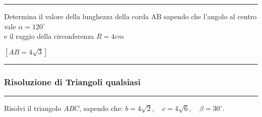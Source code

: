 \documentclass[12pt, a4paper]{exam}
\begin{document}
\begin{questions}
  \vspace{12pt}
  \vspace{15pt}
  \hrule

  \addpoints
  \question[8]
  Determina il valore della lunghezza della corda $\overline{\text{AB}}$ sapendo che l'angolo al centro vale $\alpha = 120^{\circ}$\\ e il raggio della circonferenza $R = 4 cm$

    \begin{solution}
      $\left[AB = 4 \sqrt{3} \right]$
    \end{solution}
    \vspace{15pt}
    \begin{center}
  \end{center}

\hrule
\newpage
  \subsubsection*{Risoluzione di Triangoli qualsiasi}
  \vspace{10pt}

  \hrule
  \addpoints
  \question[10]
Risolvi il triangolo $A B C$, sapendo che: $b=4 \sqrt{2}, \quad c=4 \sqrt{6}, \quad \beta=30^{\circ}$.

\vspace{10pt}
\end{questions}
\end{document}
